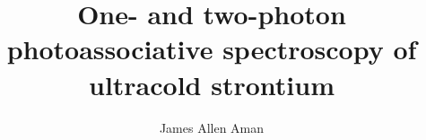 \documentclass[12pt]{ruthesis}
\title{One- and two-photon photoassociative spectroscopy of ultracold strontium}
\author{James Allen Aman}
\begin{document}
  \begin{frontmatter}
  \pagestyle{frontmatterStyle}
   \maketitle
   
   
   
   
   
   \tableofcontents
   \listoffigures
   \listoftables
  \end{frontmatter}
  













\begin{appendices}

%
%
%
%
%
%
%
%
%
%

%
\end{appendices}
\end{document}
